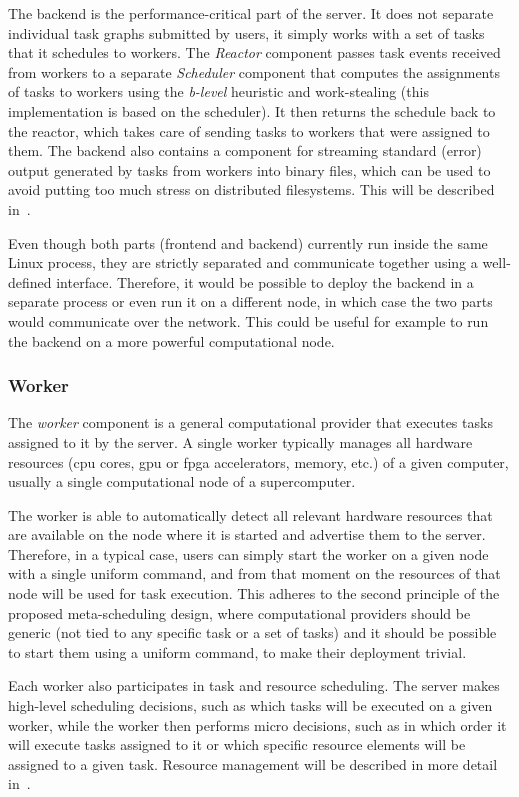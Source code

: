 The backend is the performance-critical part of the server. It does not separate individual task
graphs submitted by users, it simply works with a set of tasks that it schedules to workers. The
\emph{Reactor} component passes task events received from workers to a separate
\emph{Scheduler} component that computes the assignments of tasks to workers using the
\emph{b-level} heuristic and work-stealing (this implementation is based on the
\rsds{} scheduler). It then returns the schedule back to the reactor, which takes
care of sending tasks to workers that were assigned to them. The backend also contains a component
for streaming standard (error) output generated by tasks from workers into binary files, which can
be used to avoid putting too much stress on distributed filesystems. This will be described
in~.

Even though both parts (frontend and backend) currently run inside the same Linux process, they are
strictly separated and communicate together using a well-defined interface. Therefore, it would be
possible to deploy the backend in a separate process or even run it on a different node, in which
case the two parts would communicate over the network. This could be useful for example to run the
backend on a more powerful computational node.

\subsubsection*{Worker}
The \emph{worker} component is a general computational provider that executes tasks
assigned to it by the server. A single worker typically manages all hardware resources
(\gls{cpu} cores, \gls{gpu} or \gls{fpga} accelerators,
memory, etc.) of a given computer, usually a single computational node of a supercomputer.

The worker is able to automatically detect all relevant hardware resources that are available on
the node where it is started and advertise them to the server. Therefore, in a typical case, users
can simply start the worker on a given node with a single uniform command, and from that moment on
the resources of that node will be used for task execution. This adheres to the second principle of
the proposed meta-scheduling design, where computational providers should be generic (not tied to
any specific task or a set of tasks) and it should be possible to start them using a uniform
command, to make their deployment trivial.

Each worker also participates in task and resource scheduling. The server makes high-level
scheduling decisions, such as which tasks will be executed on a given worker, while the worker then
performs micro decisions, such as in which order it will execute tasks assigned to it or which
specific resource elements will be assigned to a given task. Resource management will be described
in more detail in~.

